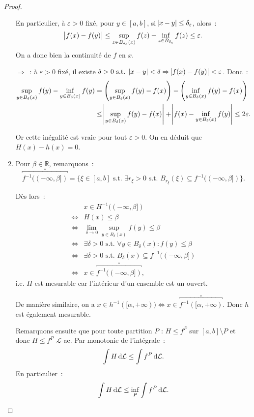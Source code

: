 \documentclass{article}
\theoremstyle{definition}
\newcommand{\pinfty}{{+\infty}}
\newcommand{\minfty}{{-\infty}}
\newcommand{\st}{\text{ s.t. }}
\newcommand{\R}{{\mathbb R}}
\begin{document}
\begin{proof}
\begin{enumerate}
	En particulier, à $\varepsilon > 0$ fixé, pour $y \in [a, b]$, si $\abs {x-y} \leq \delta_\varepsilon$, alors~:
	\[\abs {f(x)-f(y)} \leq \sup_{z \in B_{\delta_\varepsilon}(x)}f(z) - \inf_{z \in B_{\delta_\varepsilon}}f(z) \leq \varepsilon.\]
	On a donc bien la continuité de $f$ en $x$.

	\underline {$\Rightarrow$~:} à $\varepsilon > 0$ fixé, il existe $\delta > 0 \st \abs {x-y} < \delta \Rightarrow \abs {f(x)-f(y)} < \varepsilon$. Donc~:
	\begin{align*}
		\sup_{y \in B_\delta(x)}f(y) - \inf_{y \in B_\delta(x)}f(y) &= \left(\sup_{y \in B_\delta(x)}f(y) - f(x)\right) - \left(\inf_{y \in B_\delta(x)}f(y) - f(x)\right) \\
		&\leq \abs {\sup_{y \in B_\delta(x)}f(y)-f(x)} + \abs {f(x)-\inf_{y \in B_\delta(x)}f(y)} \leq 2\varepsilon.
	\end{align*}

	Or cette inégalité est vraie pour tout $\varepsilon > 0$. On en déduit que $H(x)-h(x) = 0$.

	\item Pour $\beta \in \R$, remarquons~:
	\[\overbracket {f^{-1}((\minfty, \beta])}^{\circ} = \{\xi \in [a, b] \st \exists r_\xi > 0 \st B_{r_\xi}(\xi) \subseteq f^{-1}((\minfty, \beta])\}.\]

	Dès lors~:
	\begin{align*}
	     & x \in H^{-1}((\minfty, \beta]) \\
	\iff & H(x) \leq \beta  \\
	\iff & \lim_{\delta \to 0}\sup_{y \in B_\delta(x)}f(y) \leq \beta \\
	\iff & \exists \delta > 0 \st \forall y \in B_\delta(x) : f(y) \leq \beta \\
	\iff & \exists \delta > 0 \st B_\delta(x) \subseteq f^{-1}((\minfty, \beta]) \\
	\iff & x \in \overbracket {f^{-1}((\minfty, \beta])}^{\circ},
	\end{align*}
	i.e. $H$ est mesurable car l'intérieur d'un ensemble est un ouvert.

	De manière similaire, on a $x \in h^{-1}([\alpha, \pinfty)) \iff x \in \overbracket {f^{-1}([\alpha, \pinfty)}^{\circ}$. Donc $h$ est également mesurable.

	Remarquons ensuite que pour toute partition $P$ : $H \leq f^P$ sur $[a, b] \setminus P$ et donc $H \leq f^P$ $\mathcal L$-ae. Par monotonie de l'intégrale~:
	\[\int H\dif\mathcal L \leq \int f^P\dif\mathcal L.\]
	En particulier~:
	\[\int H\dif \mathcal L \leq \inf_P\int f^P\dif\mathcal L.\]


\end{enumerate}
\end{proof}
\end{document}
